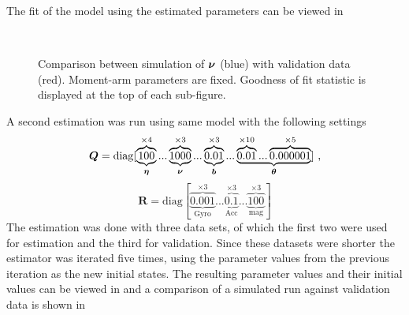 The fit of the model using the estimated parameters can be viewed in 
\begin{figure}[tbp]
  \centering
  \qquad
  \\
  \caption{\label{fig:ResultKalmanFixedMomentArms}%
    Comparison between simulation of $\boldsymbol{\nu}$ (blue) with validation data (red). Moment-arm parameters are fixed. Goodness of fit statistic is displayed at the top of each sub-figure.}
\end{figure}

A second estimation was run using same model with the following settings
\begin{equation*}
\boldsymbol{Q}=\text{diag}[\underbrace{\overbrace{100}^{\times4}}_{\boldsymbol{\eta}}... \underbrace{\overbrace{1000}^{\times3}}_{\boldsymbol{\nu}}...\underbrace{\overbrace{0.01}^{\times3}}_{\boldsymbol{b}}... \underbrace{\overbrace{0.01}^{\times10}... \overbrace{0.000001}^{\times5}}_{\boldsymbol{\theta}}]\text{ ,}
\end{equation*}
\begin{equation*}
\boldsymbol{R} = \text{diag}[\underbrace{\overbrace{0.001}^{\times3}}_{\text{Gyro}}... \underbrace{\overbrace{0.1}^{\times3}}_{\text{Acc}}... \underbrace{\overbrace{100}^{\times3}}_{\text{mag}}]
\end{equation*}
The estimation was done with three data sets, of which the first two were used for estimation and the third for validation. Since these datasets were shorter the estimator was iterated five times, using the parameter values from the previous iteration as the new initial states. The resulting parameter values and their initial values can be viewed in  and a comparison of a simulated run against validation data is shown in 

